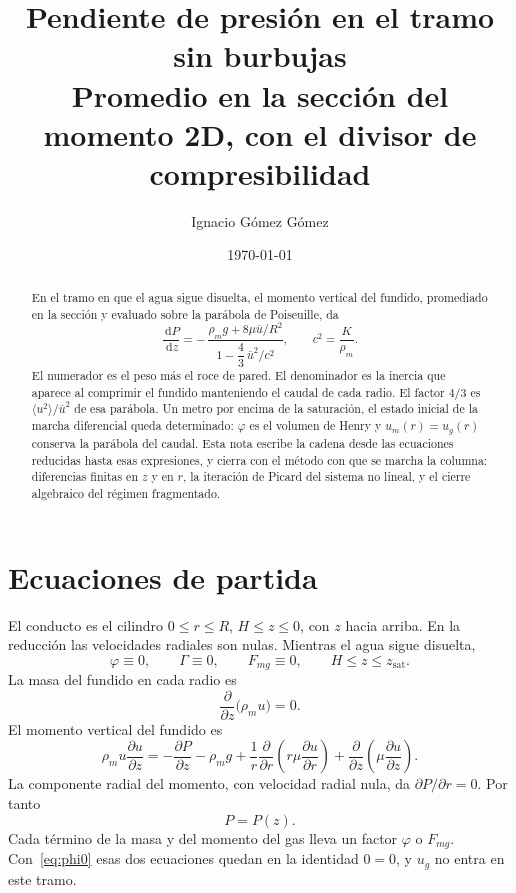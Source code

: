 \documentclass[11pt,a4paper]{article}
\title{\vspace{-1.4cm}
\textbf{Pendiente de presión en el tramo sin burbujas}\\[0.35em]
\large Promedio en la sección del momento 2D, con el divisor de compresibilidad}
\author{Ignacio Gómez Gómez}
\date{\today}
\newcommand{\dd}{\,\mathrm{d}}
\newcommand{\p}{\partial}
\newcommand{\sat}{\mathrm{sat}}
\theoremstyle{plain}
\theoremstyle{definition}
\theoremstyle{remark}
\begin{document}
\maketitle
\vspace{-0.7cm}

\begin{abstract}\noindent
En el tramo en que el agua sigue disuelta, el momento vertical del fundido,
promediado en la sección y evaluado sobre la parábola de Poiseuille, da
\[
\frac{\dd P}{\dd z}
=
-\,
\frac{\rho_m g+8\mu\bar u/R^2}
{1-\dfrac{4}{3}\,\bar u^2/c^2},
\qquad
c^2=\frac{K}{\rho_m}.
\]
El numerador es el peso más el roce de pared. El denominador es la inercia
que aparece al comprimir el fundido manteniendo el caudal de cada radio.
El factor \(4/3\) es \(\langle u^2\rangle/\bar u^2\) de esa parábola.
Un metro por encima de la saturación, el estado inicial de la marcha
diferencial queda determinado: \(\varphi\) es el volumen de Henry y
\(u_m(r)=u_g(r)\) conserva la parábola del caudal.
Esta nota escribe la cadena desde las ecuaciones reducidas hasta esas
expresiones, y cierra con el método con que se marcha la columna:
diferencias finitas en \(z\) y en \(r\), la iteración de Picard del
sistema no lineal, y el cierre algebraico del régimen fragmentado.
\end{abstract}

\section{Ecuaciones de partida}

El conducto es el cilindro \(0\le r\le R\), \(H\le z\le 0\), con \(z\) hacia
arriba. En la reducción las velocidades radiales son nulas. Mientras el agua
sigue disuelta,
\begin{equation}
\varphi\equiv 0,
\qquad
\Gamma\equiv 0,
\qquad
F_{mg}\equiv 0,
\qquad
H\le z\le z_{\sat}.
\label{eq:phi0}
\end{equation}
La masa del fundido en cada radio es
\begin{equation}
\frac{\p}{\p z}\bigl(\rho_m u\bigr)=0.
\label{eq:masa}
\end{equation}
El momento vertical del fundido es
\begin{equation}
\rho_m u\frac{\p u}{\p z}
=
-\frac{\p P}{\p z}
-\rho_m g
+\frac{1}{r}\frac{\p}{\p r}\!\left(r\mu\frac{\p u}{\p r}\right)
+\frac{\p}{\p z}\!\left(\mu\frac{\p u}{\p z}\right).
\label{eq:mom}
\end{equation}
La componente radial del momento, con velocidad radial nula, da
\(\p P/\p r=0\). Por tanto
\begin{equation}
P=P(z).
\label{eq:Pdez}
\end{equation}
Cada término de la masa y del momento del gas lleva un factor \(\varphi\) o
\(F_{mg}\). Con~\eqref{eq:phi0} esas dos ecuaciones quedan en la identidad
\(0=0\), y \(u_g\) no entra en este tramo.
\end{document}
